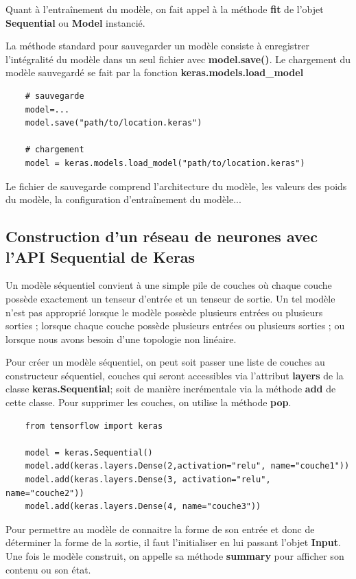 \documentclass[a4paper,12pt,twoside]{report}
\theoremstyle{definition}
\theoremstyle{plain}
\theoremstyle{remark}
\begin{document}
Quant à l'entraînement du modèle, on fait appel à la méthode \textbf{fit} de l'objet \textbf{Sequential} ou \textbf{Model} instancié.

La méthode standard pour sauvegarder un modèle consiste à enregistrer l'intégralité du modèle dans un seul fichier avec \textbf{model.save()}. Le chargement du modèle sauvegardé se fait par la fonction \textbf{keras.models.load\_model}

\begin{lstlisting}
	# sauvegarde
	model=...
	model.save("path/to/location.keras")
	
	# chargement
	model = keras.models.load_model("path/to/location.keras")
\end{lstlisting}

Le fichier de sauvegarde comprend l'architecture du modèle, les valeurs des poids du modèle, la configuration d'entraînement du modèle...

\subsection{Construction d'un réseau de neurones avec l'API Sequential de Keras}

Un modèle séquentiel convient à une simple pile de couches où chaque couche possède exactement un tenseur d'entrée et un tenseur de sortie. Un tel modèle n'est pas approprié lorsque le modèle possède plusieurs entrées ou plusieurs sorties ; lorsque chaque couche possède plusieurs entrées ou plusieurs sorties ; ou lorsque nous avons besoin d'une topologie non linéaire.

Pour créer un modèle séquentiel, on peut soit passer une liste de couches au constructeur séquentiel, couches qui seront accessibles via l'attribut \textbf{layers} de la classe \textbf{keras.Sequential}; soit de manière incrémentale via la méthode \textbf{add} de cette classe. Pour supprimer les couches, on utilise la méthode \textbf{pop}.

\begin{lstlisting}
	from tensorflow import keras
	
	model = keras.Sequential()
	model.add(keras.layers.Dense(2,activation="relu", name="couche1"))
	model.add(keras.layers.Dense(3, activation="relu", name="couche2"))
	model.add(keras.layers.Dense(4, name="couche3"))
\end{lstlisting}

Pour permettre au modèle de connaitre la forme de son entrée et donc de déterminer la forme de la sortie, il faut l'initialiser en lui passant l'objet \textbf{Input}.
Une fois le modèle construit, on appelle sa méthode \textbf{summary} pour afficher son contenu ou son état.
\end{document}
